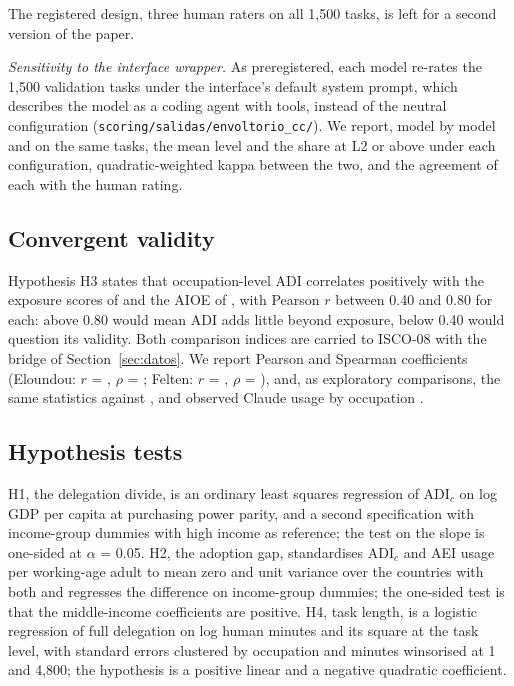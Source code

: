 The registered design, three human raters on all 1,500 tasks, is left for a second version of the paper.

\emph{Sensitivity to the interface wrapper.}
As preregistered, each model re-rates the 1,500 validation tasks under the interface's default system prompt, which describes the model as a coding agent with tools, instead of the neutral configuration (\texttt{scoring/salidas/envoltorio\_cc/}).
We report, model by model and on the same tasks, the mean level and the share at L2 or above under each configuration, quadratic-weighted kappa between the two, and the agreement of each with the human rating.

\subsection{Convergent validity}

Hypothesis H3 states that occupation-level ADI correlates positively with the exposure scores of \citet{eloundou2024gpts} and the AIOE of \citet{felten2021occupational}, with Pearson $r$ between 0.40 and 0.80 for each: above 0.80 would mean ADI adds little beyond exposure, below 0.40 would question its validity.
Both comparison indices are carried to ISCO-08 with the bridge of Section~\ref{sec:datos}.
We report Pearson and Spearman coefficients (Eloundou: $r$ = , $\rho$ = ; Felten: $r$ = , $\rho$ = ), and, as exploratory comparisons, the same statistics against \citet{webb2020impact}, \citet{eisfeldt2023generative} and observed Claude usage by occupation \citep{handa2025economic}.

\subsection{Hypothesis tests}

H1, the delegation divide, is an ordinary least squares regression of $\mathrm{ADI}_c$ on log GDP per capita at purchasing power parity, and a second specification with income-group dummies with high income as reference; the test on the slope is one-sided at $\alpha$ = 0.05.
H2, the adoption gap, standardises $\mathrm{ADI}_c$ and AEI usage per working-age adult to mean zero and unit variance over the countries with both and regresses the difference on income-group dummies; the one-sided test is that the middle-income coefficients are positive.
H4, task length, is a logistic regression of full delegation on log human minutes and its square at the task level, with standard errors clustered by occupation and minutes winsorised at 1 and 4,800; the hypothesis is a positive linear and a negative quadratic coefficient.

